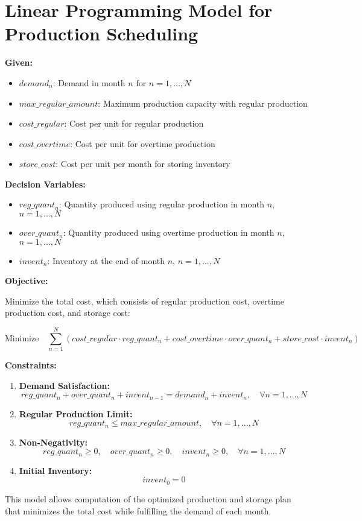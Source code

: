 \documentclass{article}
\begin{document}
\section*{Linear Programming Model for Production Scheduling}

\textbf{Given:}
\begin{itemize}
    \item $demand_n$: Demand in month $n$ for $n = 1, \ldots, N$
    \item $max\_regular\_amount$: Maximum production capacity with regular production
    \item $cost\_regular$: Cost per unit for regular production
    \item $cost\_overtime$: Cost per unit for overtime production
    \item $store\_cost$: Cost per unit per month for storing inventory
\end{itemize}

\textbf{Decision Variables:}
\begin{itemize}
    \item $reg\_quant_n$: Quantity produced using regular production in month $n$, $n = 1, \ldots, N$
    \item $over\_quant_n$: Quantity produced using overtime production in month $n$, $n = 1, \ldots, N$
    \item $invent_n$: Inventory at the end of month $n$, $n = 1, \ldots, N$
\end{itemize}

\textbf{Objective:}

Minimize the total cost, which consists of regular production cost, overtime production cost, and storage cost:

\[
\text{Minimize} \quad \sum_{n=1}^{N} \left( cost\_regular \cdot reg\_quant_n + cost\_overtime \cdot over\_quant_n + store\_cost \cdot invent_n \right)
\]

\textbf{Constraints:}

\begin{enumerate}
    \item \textbf{Demand Satisfaction:}
    \[
    reg\_quant_n + over\_quant_n + invent_{n-1} = demand_n + invent_n, \quad \forall n = 1, \ldots, N
    \]
    \item \textbf{Regular Production Limit:}
    \[
    reg\_quant_n \leq max\_regular\_amount, \quad \forall n = 1, \ldots, N
    \]
    \item \textbf{Non-Negativity:}
    \[
    reg\_quant_n \geq 0, \quad over\_quant_n \geq 0, \quad invent_n \geq 0, \quad \forall n = 1, \ldots, N
    \]
    \item \textbf{Initial Inventory:}
    \[
    invent_0 = 0
    \]
\end{enumerate}

This model allows computation of the optimized production and storage plan that minimizes the total cost while fulfilling the demand of each month.
\end{document}
